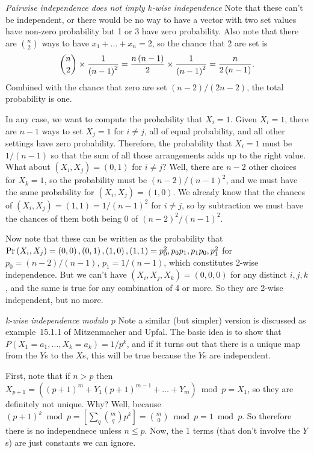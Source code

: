  {\it Pairwise independence does not imply $k$-wise independence}\hfil\break
Note that these can't be independent, or there would be no way to have a vector
with two set values have non-zero probability but 1 or 3 have zero probability.
Also note that there are $n \choose 2$ ways to have $x_1 + \ldots + x_n = 2$,
so the chance that 2 are set is 
$$
{n \choose 2} \times {1 \over \left(n - 1\right)^2} =
{n \left(n - 1\right) \over 2} \times {1 \over \left(n - 1\right)^2} = {n \over 2 \left(n - 1\right)}.
$$
Combined with the chance that zero are set $\left(n - 2\right) / \left(2 n - 2\right)$,
the total probability is one.

In any case, we want to compute the probability that $X_i = 1$.  Given $X_i = 1$, there are $n - 1$
ways to set $X_j = 1$ for $i \neq j$, all of equal probability, and all other settings have zero probability.
Therefore, the probability that $X_i = 1$ must be $1 / \left(n - 1\right)$ so that the sum of
all those arrangements adds up to the right value.  What about $\left(X_i, X_j\right) = \left(0, 1\right)$ 
for $i \neq j$? Well, there are $n-2$ other choices for $X_k = 1$, so the probability
must be $\left(n - 2 \right) / \left(n - 1\right)^2$, and we must have the same probability
for $\left(X_i, X_j\right) = \left(1, 0\right)$.  We already know that the chances of
$\left(X_i, X_j\right) = \left(1, 1\right) = 1 / \left(n - 1\right)^2$ for $i \neq j$,
so by subtraction we must have the chances of them both being 0 of
$\left(n - 2\right)^2 / \left(n - 1\right)^2$.

Now note that these can be written as the probability that ${\rm Pr} \left(X_i, X_j\right) = 
\left(0, 0\right), \left(0, 1\right), \left(1, 0\right), \left(1, 1\right) =
p_0^2, p_0 p_1, p_1 p_0, p_1^2$ for $p_0 = {\left( n - 2\right) / \left(n - 1\right)}$,
$p_1 = 1 / \left(n - 1\right)$, which constitutes 2-wise independence.
But we can't have $\left(X_i, X_j, X_k\right) = \left(0, 0, 0\right)$ for any distinct
$i, j, k$, and the same is true for any combination of 4 or more.  So they are 2-wise
independent, but no more.

 {\it k-wise independence modulo $p$}\hfil\break
Note a similar (but simpler) version is discussed as example~15.1.1 of Mitzenmacher and Upfal.
The basic idea is to show that $P\left(X_1 = a_1, \dots, X_k = a_k\right) = 1 / p^k$, and if it turns
out that there is a unique map from the $Y$s to the $X$s, this will be true because the $Y$s are
independent.

First, note that if $n > p$ then $X_{p+1} = \left( \left(p+1\right)^m + Y_1 \left(p+1\right)^{m-1}
 + \ldots + Y_m\right) \bmod p =X_1$, so they are definitely not unique.  Why?  Well, because
 $\left(p + 1\right)^k \bmod p = \left[ \sum_q {m \choose q} p^k  \right] = {m \choose 0} \bmod p = 
 1 \bmod p$.  So therefore there is no independnece unless $n \leq p$.  Now, the 1 terms (that don't
 involve the $Y$s) are just constants we can ignore.

